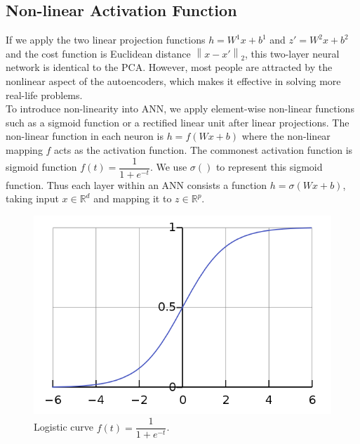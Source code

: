 \documentclass[12pt]{report} %
\newcommand{\norm}[1]{\left\lVert #1 \right\rVert}
\begin{document}
\subsection{Non-linear Activation Function}
If we apply the two linear projection functions $h=W^1x+b^1$ and $z'=W^2x+b^2$ and the cost function is Euclidean distance $\norm{x-x'}_2$, this two-layer neural network is identical to the PCA. However, most people are attracted by the nonlinear aspect of the autoencoders, which makes it effective in solving more real-life problems.\\
To introduce non-linearity into ANN, we apply element-wise non-linear functions such as a sigmoid function or a rectified linear unit after linear projections. The non-linear function in each neuron is $h= f(Wx + b)$ where the non-linear mapping $f$ acts as the activation function. The commonest activation function is sigmoid function $f(t)=\dfrac{1}{1+e^{-t}}$. We use $\sigma()$ to represent this sigmoid function. Thus each layer within an ANN consists a function \(h=\sigma(Wx+b)\), taking input \(x\in \mathbb{R}^{d}\) and mapping it to \(z\in \mathbb{R}^{p}\).
\begin{figure}[H]
	\centering
	\includegraphics[scale=0.5]{pictures/sigmoid.png}
	\caption{Logistic curve $f(t)=\dfrac{1}{1+e^{-t}}$\cite{SIGPIC}.}
	\label{fig:3}
\end{figure}
\end{document}

